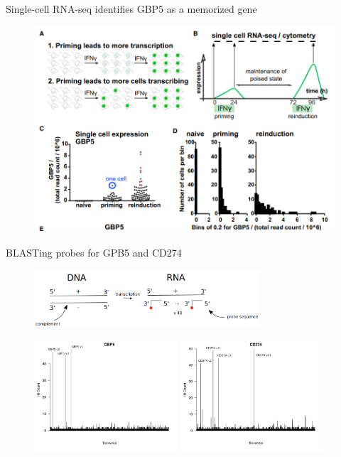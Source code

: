 \documentclass[aspectratio=1610]{beamer}					%
\begin{document}
\begin{frame}{Single-cell RNA-seq identifies GBP5 as a memorized gene}
\begin{figure}
\includegraphics[width=12cm]{figure-3.png}
\end{figure}

\end{frame}


\begin{frame}{BLASTing probes for GPB5 and CD274}
\begin{figure}
   \includegraphics[width=0.75\textwidth]{Probe-Design.png}
\end{figure}
\begin{figure}
   \includegraphics[width=0.475\textwidth]{GBP5_Hits.png}
   \hfill
   \includegraphics[width=0.475\textwidth]{CD274_Hits.png}
\end{figure}
\end{frame}
\end{document}
